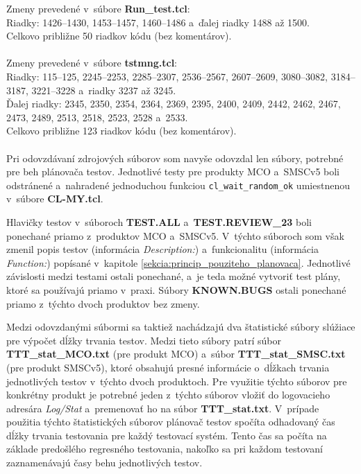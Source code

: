 \noindent Zmeny prevedené v~súbore \textbf{Run\_test.tcl}: \\
Riadky: 1426--1430, 1453--1457, 1460--1486 a~ďalej riadky 1488 až 1500. \\
Celkovo približne 50 riadkov kódu (bez komentárov).
\\
\\
\noindent Zmeny prevedené v~súbore \textbf{tstmng.tcl}: \\
Riadky: 115--125, 2245--2253, 2285--2307, 2536--2567, 2607--2609, 
3080--3082, 3184--3187, 3221--3228 a~riadky 3237 až 3245. \\
Ďalej riadky: 2345, 2350, 2354, 2364, 2369, 2395, 2400, 2409, 2442, 
2462, 2467, 2473, 2489, 2513, 2518, 2523, 2528 a~2533. \\
Celkovo približne 123 riadkov kódu (bez komentárov).
\\
\\
Pri odovzdávaní zdrojových súborov som navyše odovzdal len súbory,
potrebné pre beh plánovača testov. Jednotlivé testy pre produkty MCO
a~SMSCv5 boli odstránené a~nahradené jednoduchou funkciou \texttt{cl\_wait\_random\_ok}
umiestnenou v~súbore \textbf{CL-MY.tcl}. 

Hlavičky testov v~súboroch \textbf{TEST.ALL} a~\textbf{TEST.REVIEW\_23} 
boli ponechané priamo z~produktov MCO a~SMSCv5. V~týchto súboroch som 
však zmenil popis testov (informácia \textit{Description:}) a~funkcionalitu (informácia
\textit{Function:}) popísané v~kapitole \ref{sekcia:princip_pouziteho_planovaca}.
Jednotlivé závislosti medzi testami ostali ponechané, a~je teda možné 
vytvoriť test plány, ktoré sa používajú priamo v~praxi.
Súbory \textbf{KNOWN.BUGS} ostali ponechané priamo z~týchto
dvoch produktov bez zmeny. 

Medzi odovzdanými súbormi sa taktiež nachádzajú dva štatistické súbory slúžiace pre výpočet
dĺžky trvania testov. Medzi tieto súbory patrí súbor \textbf{TTT\_stat\_MCO.txt} (pre produkt MCO) 
a~súbor \textbf{TTT\_stat\_SMSC.txt} (pre produkt SMSCv5), ktoré obsahujú presné informácie o~dĺžkach
trvania jednotlivých testov v~týchto dvoch produktoch. Pre využitie týchto
súborov pre konkrétny produkt je potrebné jeden z~týchto súborov vložiť do logovacieho adresára \textit{Log/Stat} 
a~premenovať ho na súbor \textbf{TTT\_stat.txt}.
V~prípade použitia týchto štatistických súborov plánovač testov spočíta
odhadovaný čas dĺžky trvania testovania pre každý testovací systém.
Tento čas sa počíta na základe predošlého regresného testovania,
nakoľko sa pri každom testovaní zaznamenávajú časy behu jednotlivých testov.



